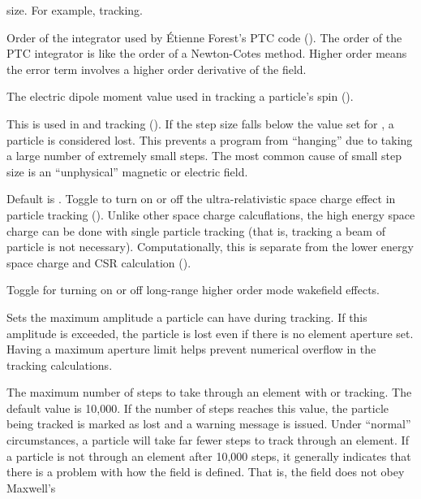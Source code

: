 {\begin{description}
size. For example,  tracking.
%
\item[\vn{default_integ_order}] \Newline
Order of the integrator used by \'Etienne Forest's PTC code ().
The order of the PTC integrator is like the order of a Newton-Cotes method.
Higher order means the error term involves a higher order derivative of the field.
%
\item[\vn{electric_dipole_moment}] \Newline
The electric dipole moment value used in tracking a particle's spin ().
%
\item[\vn{fatal_ds_adaptive_tracking}] \Newline
This is used in  and  tracking
().  If the step size falls below the value set for
, a particle is considered lost.
This prevents a program from ``hanging'' due to taking a large number
of extremely small steps. The most common cause of small step size is
an ``unphysical'' magnetic or electric field.
%
\item[\vn{high_energy_space_charge_on}] \Newline
Default is . Toggle to turn on or off the ultra-relativistic space charge effect in
particle tracking (). Unlike other space charge calcuflations, the high
energy space charge can be done with single particle tracking (that is, tracking a beam of particle
is not necessary). Computationally, this is separate from the lower energy space charge and CSR
calculation ().
%
\item[\vn{lr_wakes_on}] \Newline
Toggle for turning on or off long-range higher order mode wakefield effects.
%
\item[\vn{max_aperture_limit}] \Newline 
Sets the maximum amplitude a particle can have during tracking. If this amplitude is exceeded, the
particle is lost even if there is no element aperture set. Having a maximum aperture limit helps
prevent numerical overflow in the tracking calculations.
%
\item[\vn{max_num_runge_kutta_step}] \Newline 
The maximum number of steps to take through an element with  or
 tracking. The default value is 10,000. If the number of steps reaches this
value, the particle being tracked is marked as lost and a warning message is issued. Under
``normal'' circumstances, a particle will take far fewer steps to track through an element. If a
particle is not through an element after 10,000 steps, it generally indicates that there is a
problem with how the field is defined. That is, the field does not obey Maxwell's

\end{description}}
